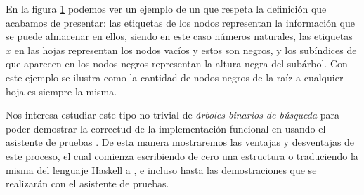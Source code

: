 \begin{figure}[!ht]
\centering
\captionsetup{justification=centering}
\caption {\Arn}
\label{arbolRB_1}
\end{figure}

En la figura \ref{arbolRB_1} podemos ver un ejemplo de un {\arn} que respeta la definici\'on que
acabamos de presentar: las etiquetas de los nodos representan la informaci\'on que se puede 
almacenar en ellos, siendo en este caso n\'umeros naturales, las etiquetas $x$ en las hojas 
representan los nodos vacíos y estos son negros, y los subíndices de que aparecen en los nodos 
negros representan la altura negra del sub\'arbol. Con este ejemplo se ilustra como la cantidad de 
nodos negros de la ra\'iz a cualquier hoja es siempre la misma.

Nos interesa estudiar este tipo no trivial de \textit{\'arboles binarios de búsqueda} para poder
demostrar la correctud de la implementaci\'on funcional en \cite{tesisG} usando el asistente de 
pruebas {\coq}. De esta manera mostraremos las ventajas y desventajas de este proceso, el cual 
comienza escribiendo de cero una estructura o traduciendo la misma del lenguaje Haskell a {\coq}, e 
incluso hasta las demostraciones que se realizar\'an con el asistente de pruebas.

